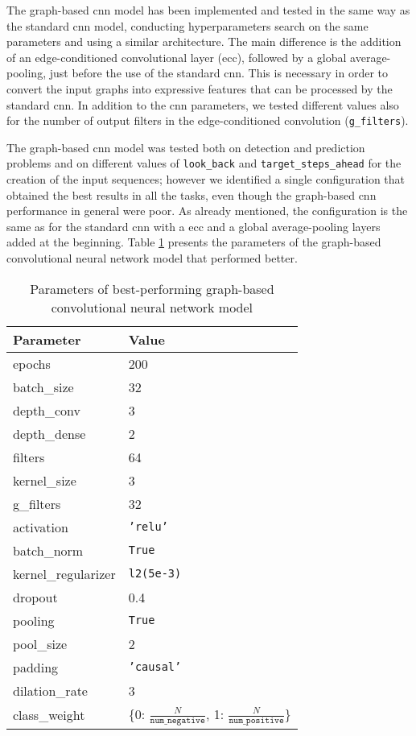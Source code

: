 The graph-based \acs{cnn} model has been implemented and tested in the same way as the standard \acs{cnn} model, conducting hyperparameters search on the same parameters and using a similar architecture. The main difference is the addition of an edge-conditioned convolutional layer (\acs{ecc}), followed by a global average-pooling, just before the use of the standard \acs{cnn}. This is necessary in order to convert the input graphs into expressive features that can be processed by the standard \acs{cnn}. In addition to the \acs{cnn} parameters, we tested different values also for the number of output filters in the edge-conditioned convolution (\texttt{g\_filters}).

The graph-based \acs{cnn} model was tested both on detection and prediction problems and on different values of \texttt{look\_back} and \texttt{target\_steps\_ahead} for the creation of the input sequences; however we identified a single configuration that obtained the best results in all the tasks, even though the graph-based \acs{cnn} performance in general were poor. As already mentioned, the configuration is the same as for the standard \acs{cnn} with a \acs{ecc} and a global average-pooling layers added at the beginning. Table \ref{tab:gconv_param} presents the parameters of the graph-based convolutional neural network model that performed better.
\begin{table}[htbp]
    \centering
    \begin{tabular}{ll}
        \hline
        \textbf{Parameter}  & \textbf{Value} \\\hline
        epochs              & 200 \\
        batch\_size         & 32 \\
        depth\_conv         & 3 \\
        depth\_dense        & 2 \\
        filters             & 64 \\
        kernel\_size        & 3 \\
        g\_filters          & 32 \\
        activation          & \texttt{'relu'} \\
        batch\_norm         & \texttt{True} \\
        kernel\_regularizer & \texttt{l2(5e-3)} \\
        dropout             & 0.4 \\
        pooling             & \texttt{True} \\
        pool\_size          & 2 \\
        padding             & \texttt{'causal'} \\
        dilation\_rate      & 3 \\
        class\_weight       & \{0: $\frac{N}{\texttt{num\_negative}}$, 1: $\frac{N}{\texttt{num\_positive}}$\} \\\hline
    \end{tabular}
    \caption{Parameters of best-performing graph-based convolutional neural network model}
    \label{tab:gconv_param}
\end{table}

